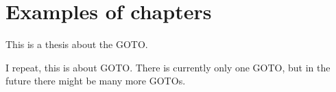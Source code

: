 
\chapter{Examples of chapters}
\label{c:examples}
\newpage


This is a thesis about the \ac{GOTO}.

I repeat, this is about \ac{GOTO}. There is currently only one \ac{GOTO}, but in the future there might be many more \ac{GOTO}s.

\lipsum[1-5]
